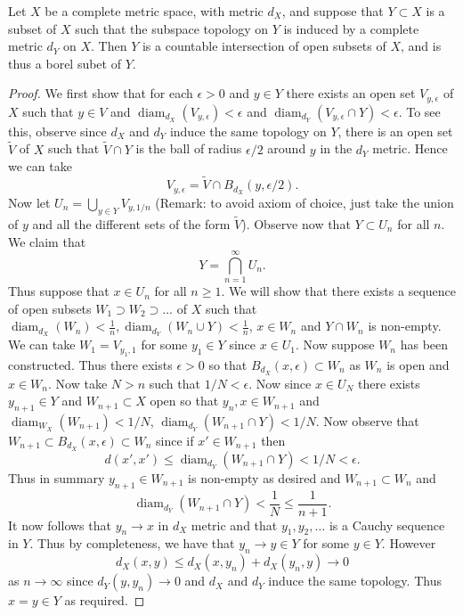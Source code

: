 \documentclass[twoside, a4paper, 10pt]{amsart}
\begin{document}
\begin{lemma} Let $X$ be a complete metric space, with metric $d_X$, and suppose that $Y \subset X$ is a subset of $X$ such that the subspace topology on $Y$ is induced by a complete metric $d_Y$ on $X$. Then $Y$ is a countable intersection of open subsets of $X$, and is thus a borel subet of $Y$.

\end{lemma}

\begin{proof} We first show that for each $\epsilon>0$ and $y \in Y$ there exists an open set $V_{y,\epsilon}$ of $X$ such that $y \in V$ and $\operatorname{diam}_{d_X}(V_{y,\epsilon}) < \epsilon$ and $\operatorname{diam}_{d_Y}(V_{y,\epsilon} \cap Y) < \epsilon$. To see this, observe since $d_X$ and $d_Y$ induce the same topology on $Y$, there is an open set $\tilde{V}$ of $X$ such that $\tilde{V} \cap Y$ is the ball of radius $\epsilon/2$ around $y$ in the $d_Y$ metric. Hence we can take $$V_{y, \epsilon} = \tilde{V} \cap B_{d_X}(y, \epsilon/2).$$ Now let $U_n = \bigcup_{y \in Y} V_{y,1/n}$ (Remark: to avoid axiom of choice, just take the union of $y$ and all the different sets of the form $\tilde{V}$). Observe now that $Y \subset U_n$ for all $n$. We claim that $$Y = \bigcap_{n = 1}^{\infty} U_n.$$ Thus suppose that $x \in U_n$ for all $n \geq 1$. We will show that there exists a sequence of open subsets $W_1 \supset W_2 \supset \ldots$ of $X$ such that $\operatorname{diam}_{d_X}(W_n) < \frac{1}{n}, \operatorname{diam}_{d_Y}(W_n \cup Y) < \frac{1}{n}$, $x \in W_n$ and $Y \cap W_n$ is non-empty. We can take $W_1 = V_{y_1,1}$ for some $y_1 \in Y$ since $x \in U_1$. Now suppose $W_n$ has been constructed. Thus there exists $\epsilon>0$ so that $B_{d_X}(x, \epsilon) \subset W_n$ as $W_n$ is open and $x \in W_n$. Now take $N>n$ such that $1/N< \epsilon$. Now since $x \in U_N$ there exists $y_{n+1} \in Y$ and $W_{n+1} \subset X$ open so that $y_n, x \in W_{n+1}$ and $\operatorname{diam}_{W_X}(W_{n+1}) < 1/N$, $\operatorname{diam}_{d_Y}(W_{n+1} \cap Y) < 1/N$. Now observe that $W_{n+1} \subset B_{d_X}(x, \epsilon) \subset W_n$ since if $x' \in W_{n+1}$ then $$d(x',x') \leq \operatorname{diam}_{d_Y}(W_{n+1} \cap Y) < 1/N < \epsilon.$$ Thus in summary $y_{n+1} \in W_{n+1}$ is non-empty as desired and $W_{n+1} \subset W_n$ and $$\operatorname{diam}_{d_Y}(W_{n+1} \cap Y) < \frac{1}{N} \leq \frac{1}{n+1}.$$ It now follows that $y_n \to x$ in $d_X$ metric and that $y_1,y_2, \ldots$ is a Cauchy sequence in $Y$. Thus by completeness, we have that $y_n \to y \in Y$ for some $y \in Y$. However $$d_X(x,y) \leq d_X(x,y_n) + d_X(y_n,y) \to 0$$ as $n \to \infty$ since $d_Y(y,y_n) \to 0$ and $d_X$ and $d_Y$ induce the same topology. Thus $x=y \in Y$ as required.\end{proof}
\end{document}
